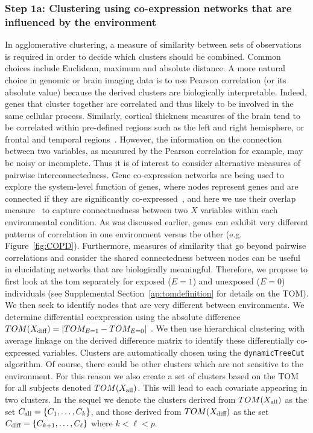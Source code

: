\subsubsection{Step 1a: Clustering using co-expression networks that are influenced by the environment}
In agglomerative clustering, a measure of similarity between sets of observations is required in order to decide which clusters should be combined. Common choices include Euclidean, maximum and absolute distance. A more natural choice in genomic or brain imaging data is to use Pearson correlation (or its absolute value) because the derived clusters are biologically interpretable. Indeed, genes that cluster together are correlated and thus likely to be involved in the same cellular process. Similarly, cortical thickness measures of the brain tend to be correlated within pre-defined regions such as the left and right hemisphere, or frontal and temporal regions~\citep{sato2013inter}. However, the information on the connection between two variables, as measured by the Pearson correlation for example, may be noisy or incomplete. Thus it is of interest to consider alternative measures of pairwise interconnectedness. Gene co-expression networks are being used to explore the system-level function of genes, where nodes represent genes and are connected if they are significantly co-expressed~\citep{zhang2005general}, and here we use their overlap measure~\citep{ravasz2002hierarchical} to capture connectnedness between two $X$ variables within each environmental condition. As was discussed earlier, genes can exhibit very different patterns of correlation in one environment versus the other (e.g. Figure~\ref{fig:COPD}). Furthermore, measures of similarity that go beyond pairwise correlations and consider the shared connectedness between nodes can be useful in elucidating networks that are biologically meaningful. Therefore, we propose to first look at the \ac{tom} separately for exposed ($E=1$) and unexposed ($E=0$) individuals (see Supplemental Section~\ref{ap:tomdefinition} for details on the TOM). We then seek to identify nodes that are very different between environments. We determine differential coexpression using the absolute difference $TOM(X_{\textrm{{diff}}}) = |TOM_{E=1} - TOM_{E=0}|$ \citep{klein2016gene}. We then use hierarchical clustering with average linkage on the derived difference matrix to identify these differentially co-expressed variables. Clusters are automatically chosen using the \texttt{dynamicTreeCut}~\citep{langfelder2008defining} algorithm. Of course, there could be other clusters which are not sensitive to the environment. For this reason we also create a set of clusters based on the TOM for all subjects denoted $TOM(X_{\textrm{{all}}})$. This will lead to each covariate appearing in two clusters. In the sequel we denote the clusters derived from $TOM(X_{\textrm{{all}}})$ as the set \mbox{$C_{\textrm{{all}}} = \left\lbrace C_1, \ldots, C_k\right\rbrace$}, and those derived from $TOM(X_{\textrm{{diff}}})$ as the set $C_{\textrm{{diff}}} = \left\lbrace C_{k+1}, \ldots, C_{\ell}\right\rbrace$ where $k < \ell < p$.  

